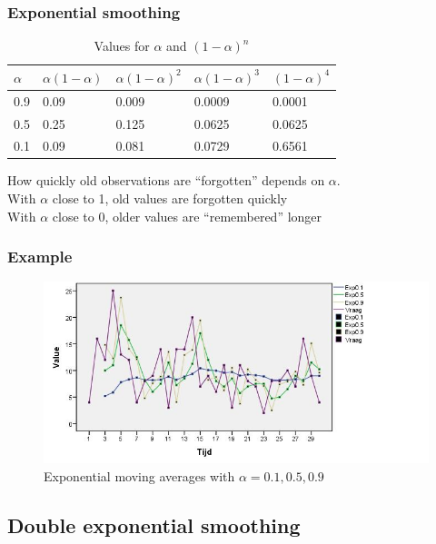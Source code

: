 \documentclass{beamer}
\begin{document}
\begin{frame}
  \frametitle{Exponential smoothing}

  \begin{table}
    \centering
    \begin{tabular}{l|l|l|l|l}
      $\alpha$ & $\alpha(1-\alpha)$ & $\alpha(1-\alpha)^{2}$ & $\alpha(1-\alpha)^{3}$ & $(1-\alpha)^{4}$ \\ \hline
      0.9   & 0.09       & 0.009             & 0.0009                      & 0.0001           \\
      0.5   & 0.25       & 0.125             & 0.0625                      & 0.0625            \\
      0.1   & 0.09       & 0.081             & 0.0729                      & 0.6561           \\
    \end{tabular}
    \caption{Values for $\alpha$ and $(1-\alpha)^{n}$}
    \label{tab:alpha}
  \end{table}
  How quickly old observations are ``forgotten'' depends on $\alpha$.\\
  With $\alpha$ close to 1, old values are forgotten quickly\\
  With $\alpha$ close to 0, older values are ``remembered'' longer
\end{frame}


\begin{frame}
  \frametitle{Example}
  \begin{figure}[htbp]
    \centering
    \includegraphics[width=\textwidth]{img/tijdreeks51}
    \caption{Exponential moving averages with $\alpha=0.1 , 0.5, 0.9$}
    \label{fig:tijdreeks51}
  \end{figure}
\end{frame}

\subsection{Double exponential smoothing}
\end{document}
